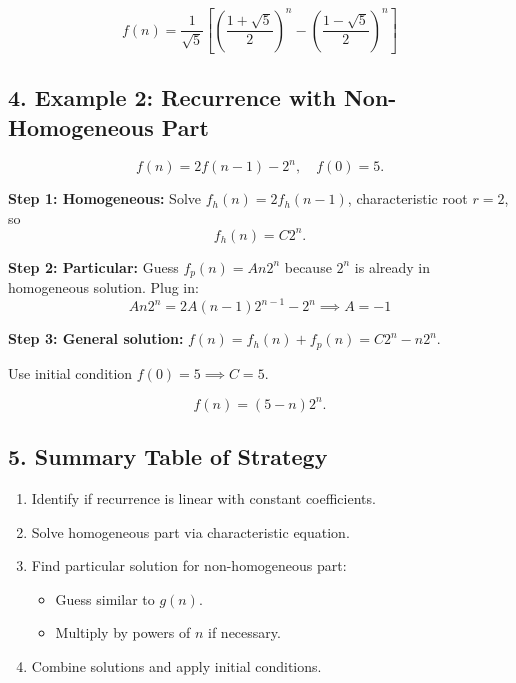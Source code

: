 \documentclass[12pt]{extarticle}
\begin{document}
\[
\boxed{f(n) = \frac{1}{\sqrt{5}}\left[ \left(\frac{1+\sqrt{5}}{2}\right)^n - \left(\frac{1-\sqrt{5}}{2}\right)^n \right]}
\]

\subsection*{4. Example 2: Recurrence with Non-Homogeneous Part}

\[
f(n) = 2 f(n-1) - 2^n, \quad f(0)=5.
\]

\textbf{Step 1: Homogeneous:} Solve \(f_h(n) = 2 f_h(n-1)\), characteristic root \(r=2\), so
\[
f_h(n) = C 2^n.
\]

\textbf{Step 2: Particular:} Guess \(f_p(n) = A n 2^n\) because \(2^n\) is already in homogeneous solution.  
Plug in:
\[
A n 2^n = 2 A (n-1) 2^{n-1} - 2^n \implies A = -1
\]

\textbf{Step 3: General solution:} \(f(n) = f_h(n) + f_p(n) = C 2^n - n 2^n\).  

Use initial condition \(f(0)=5 \implies C = 5\).  

\[
\boxed{f(n) = (5 - n) 2^n}.
\]

\subsection*{5. Summary Table of Strategy}

\begin{enumerate}
    \item Identify if recurrence is linear with constant coefficients.
    \item Solve homogeneous part via characteristic equation.
    \item Find particular solution for non-homogeneous part:
    \begin{itemize}
        \item Guess similar to \(g(n)\).
        \item Multiply by powers of \(n\) if necessary.
    \end{itemize}
    \item Combine solutions and apply initial conditions.
\end{enumerate}
\end{document}
